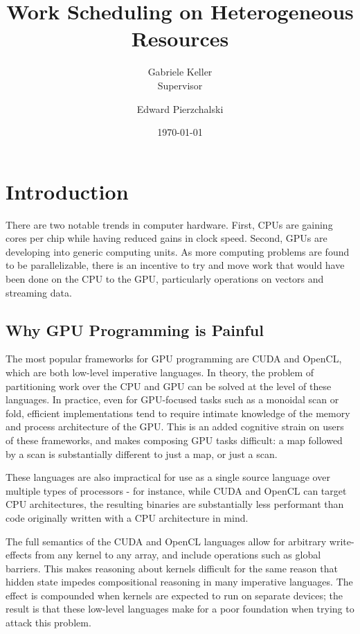 \documentclass[a4paper,12pt]{article}
\title{Work Scheduling on Heterogeneous Resources}
\date{\today}
\author{Gabriele Keller\\\small{Supervisor} \and Edward Pierzchalski}
\begin{document}
\begin{titlepage}

\cleardoublepage
\maketitle
\thispagestyle{empty}

\end{titlepage}

\section{Introduction}
There are two notable trends in computer hardware. 
First, CPUs are gaining cores per chip while having reduced gains in clock speed. Second, GPUs are developing into generic computing units. 
As more computing problems are found to be parallelizable, there is an incentive to try and move work that would have been done on the CPU to the GPU, particularly operations on vectors and streaming data.

\subsection{Why GPU Programming is Painful}
The most popular frameworks for GPU programming are CUDA and OpenCL, which are both low-level imperative languages. 
In theory, the problem of partitioning work over the CPU and GPU can be solved at the level of these languages. 
In practice, even for GPU-focused tasks such as a monoidal scan or fold, efficient implementations tend to require intimate knowledge of the memory and process architecture of the GPU. 
This is an added cognitive strain on users of these frameworks, and makes composing GPU tasks difficult: a map followed by a scan is substantially different to just a map, or just a scan.

These languages are also impractical for use as a single source language over multiple types of processors - for instance, while CUDA and OpenCL can target CPU architectures, the resulting binaries are substantially less performant than code originally written with a CPU architecture in mind.

The full semantics of the CUDA and OpenCL languages allow for arbitrary write-effects from any kernel to any array, and include operations such as global barriers. 
This makes reasoning about kernels difficult for the same reason that hidden state impedes compositional reasoning in many imperative languages. 
The effect is compounded when kernels are expected to run on separate devices; the result is that these low-level languages make for a poor foundation when trying to attack this problem.
\end{document}
